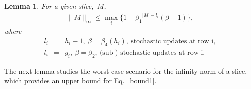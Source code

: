 \documentclass[draftclsnofoot, onecolumn, 12pt]{IEEEtran}
\newtheorem{lem}{Lemma}
\begin{document}
\begin{lem}
For a given slice,~${{{M}}}$, 
\begin{eqnarray}\label{bound1}
\|M\|_\infty\leq\max\limits_{i}\{1+{\beta_1}^{\vert {M}\vert - l_i}({\beta} -1)\},
\end{eqnarray}
where
\begin{eqnarray*}
l_i &=& h_i - 1,~\beta=\beta_4(h_i),~\mbox{stochastic updates at row i},\\
l_i &=& g_i,~\beta=\beta_2,~\mbox{(sub-) stochastic updates at row i}.
\end{eqnarray*}
\end{lem}

\noindent The next lemma studies the worst case scenario for the infinity norm of a slice, which provides an upper bound for Eq.~\eqref{bound1}.
\end{document}
